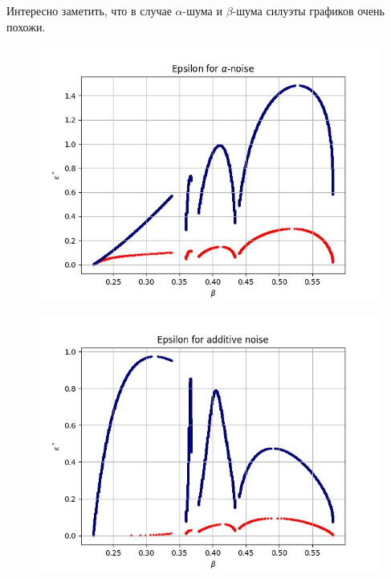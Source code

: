     Интересно заметить, что в случае \(\alpha\)-шума и \(\beta\)-шума силуэты графиков очень похожи.

    \begin{figure}
        \centering
        \includegraphics[width=\textwidth]{stochastic/images/critical_intensity_alpha_noise.jpg}
        
        \captionsetup{justification=centering}
        \caption{}
        \label{critical_intensity_alpha_noise}
    \end{figure}

    \begin{figure}
        \centering
        \includegraphics[width=\textwidth]{stochastic/images/critical_intensity_additive_noise.jpg}
        
        \captionsetup{justification=centering}
        \caption{}
        \label{critical_intensity_additive_noise}
    \end{figure}

